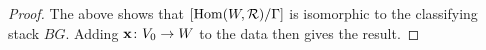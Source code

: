 \documentclass{amsart}
\newcommand{\balpha}{\boldsymbol{\alpha}}
\theoremstyle{definition}
\begin{document}
\begin{proof}
The above shows that $[\operatorname{Hom}(W,\mathcal{R})/\Gamma]$ is isomorphic to the classifying stack $BG$.
Adding $\mathbf{x} \colon V_0 \rightarrow W$ to the data then gives the result.
\end{proof}
\end{document}
